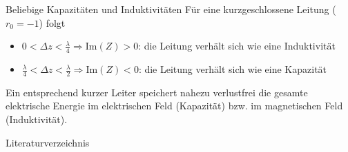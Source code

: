 \documentclass{beamer}
\begin{document}
\begin{frame}{Beliebige Kapazitäten und Induktivitäten}
Für eine kurzgeschlossene Leitung ($r_{0} = -1$) folgt
\begin{itemize}
    \item $0 < \Delta z < \frac{\lambda}{4} \Rightarrow \mathrm{Im}(Z) > 0$: die Leitung verhält
    sich wie eine Induktivität
    \item $\frac{\lambda}{4} < \Delta z < \frac{\lambda}{2} \Rightarrow \mathrm{Im}(Z) < 0$: die
    Leitung verhält sich wie eine Kapazität
\end{itemize}

Ein entsprechend kurzer Leiter speichert nahezu verlustfrei die gesamte elektrische Energie
im elektrischen Feld (Kapazität) bzw. im magnetischen Feld (Induktivität).

\end{frame}


\begin{frame}{Literaturverzeichnis}
\printbibliography
\end{frame}
\end{document}
